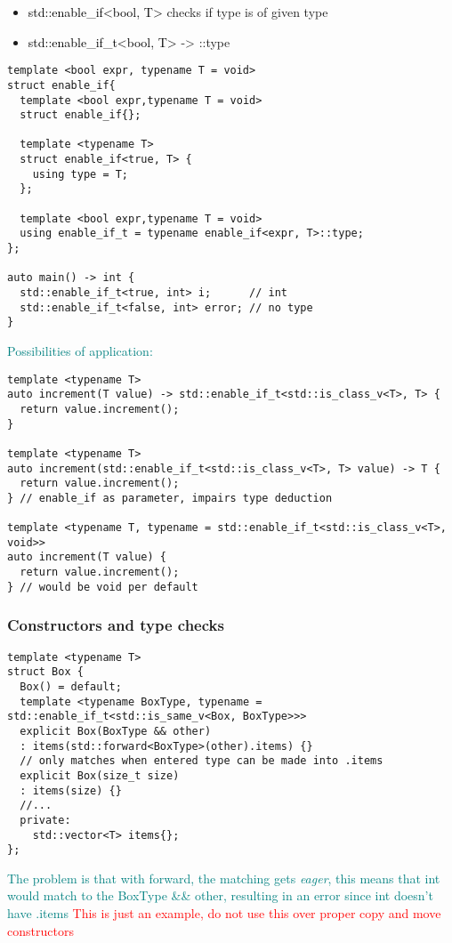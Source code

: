 \documentclass[main.tex,fontsize=8pt,paper=a4,paper=portrait,DIV=calc,]{scrartcl}
\begin{document}
\begin{itemize}
\item \textcolor{black}{std::enable\_if<bool, T>} checks if type is of given type
\item \textcolor{black}{std::enable\_if\_t<bool, T>} -> ::type
\end{itemize} 
\begin{lstlisting}
template <bool expr, typename T = void>
struct enable_if{
  template <bool expr,typename T = void>
  struct enable_if{};

  template <typename T>
  struct enable_if<true, T> {
    using type = T;
  };

  template <bool expr,typename T = void>
  using enable_if_t = typename enable_if<expr, T>::type;
};

auto main() -> int {
  std::enable_if_t<true, int> i;      // int
  std::enable_if_t<false, int> error; // no type
}
\end{lstlisting}
\textcolor{teal}{Possibilities of application:}\newline
\begin{lstlisting}
template <typename T>
auto increment(T value) -> std::enable_if_t<std::is_class_v<T>, T> {
  return value.increment();
}

template <typename T>
auto increment(std::enable_if_t<std::is_class_v<T>, T> value) -> T {
  return value.increment();
} // enable_if as parameter, impairs type deduction

template <typename T, typename = std::enable_if_t<std::is_class_v<T>, void>>
auto increment(T value) {
  return value.increment();
} // would be void per default
\end{lstlisting}

\subsubsection{Constructors and type checks}
\begin{lstlisting}
template <typename T>
struct Box {
  Box() = default;
  template <typename BoxType, typename = std::enable_if_t<std::is_same_v<Box, BoxType>>>
  explicit Box(BoxType && other)
  : items(std::forward<BoxType>(other).items) {}
  // only matches when entered type can be made into .items
  explicit Box(size_t size)
  : items(size) {}
  //...
  private:
    std::vector<T> items{};
};
\end{lstlisting}
\textcolor{teal}{The problem is that with forward, the matching gets \emph{eager}, this means that int would match to the BoxType \&\& other, resulting in an error since int doesn't have .items}\newline
\textcolor{red}{This is just an example, do not use this over proper copy and move constructors}
\end{document}
